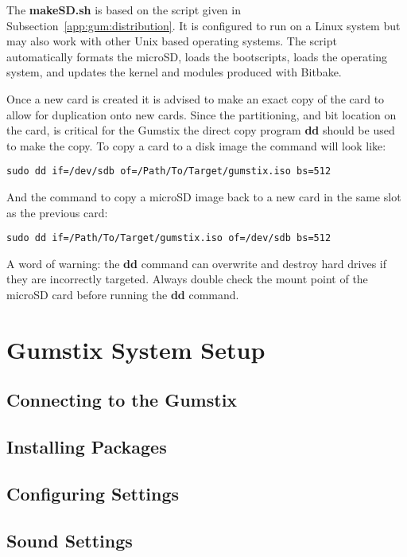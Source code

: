 The {\bf makeSD.sh} is based on the script given in Subsection~\ref{app:gum:distribution}.
It is configured to run on a Linux system but may also work with other Unix based operating systems.
The script automatically formats the microSD, loads the bootscripts, loads the operating system, and updates the kernel and modules produced with Bitbake.

Once a new card is created it is advised to make an exact copy of the card to allow for duplication onto new cards.
Since the partitioning, and bit location on the card, is critical for the Gumstix the direct copy program {\bf dd} should be used to make the copy.
To copy a card to a disk image the command will look like:

\begin{verbatim}
sudo dd if=/dev/sdb of=/Path/To/Target/gumstix.iso bs=512
\end{verbatim}

And the command to copy a microSD image back to a new card in the same slot as the previous card:

\begin{verbatim}
sudo dd if=/Path/To/Target/gumstix.iso of=/dev/sdb bs=512
\end{verbatim}

A word of warning: the {\bf dd} command can overwrite and destroy hard drives if they are incorrectly targeted.
Always double check the mount point of the microSD card before running the {\bf dd} command.

\section{Gumstix System Setup}

\subsection{Connecting to the Gumstix}

\subsection{Installing Packages}

%

\subsection{Configuring Settings}

%

\subsection{Sound Settings}
